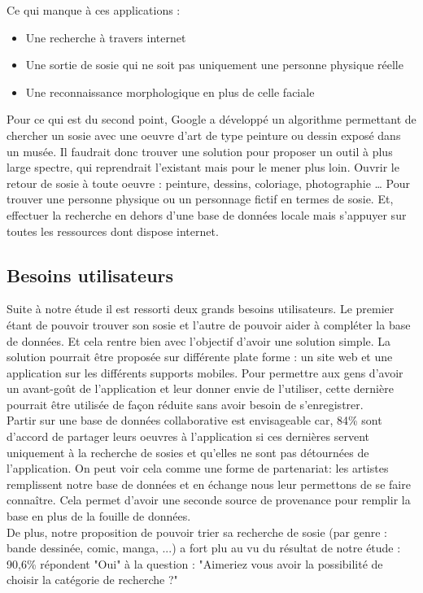 \documentclass[a4paper,12pt]{article}
\begin{document}
Ce qui manque à ces applications : 
\begin{itemize}
    \item Une recherche à travers internet 
    \item Une sortie de sosie qui ne soit pas uniquement une personne physique réelle 
    \item Une reconnaissance morphologique en plus de celle faciale
\end{itemize}

Pour ce qui est du second point, Google a développé un algorithme permettant de chercher un sosie avec une oeuvre d’art de type peinture ou dessin exposé dans un musée. Il faudrait donc trouver une solution pour proposer un outil à plus large spectre, qui reprendrait l’existant mais pour le mener plus loin. 
Ouvrir le retour de sosie à toute oeuvre : peinture, dessins, coloriage, photographie … Pour trouver une personne physique ou un personnage fictif en termes de sosie. Et, effectuer la recherche en dehors d'une base de données locale mais s'appuyer sur toutes les ressources dont dispose internet. 

\subsection{Besoins utilisateurs}
Suite à notre étude il est ressorti deux grands besoins utilisateurs. Le premier étant de pouvoir trouver son sosie et l'autre de pouvoir aider à compléter la base de données. Et cela rentre bien avec l'objectif d'avoir une solution simple. La solution pourrait être proposée sur différente plate forme : un site web et une application sur les différents supports mobiles. Pour permettre aux gens d'avoir un avant-goût de l'application et leur donner envie de l'utiliser, cette dernière pourrait être utilisée de façon réduite sans avoir besoin de s'enregistrer. 
\\ Partir sur une base de données collaborative est envisageable car, 84\% sont d'accord de partager leurs oeuvres à l'application si ces dernières servent uniquement à la recherche de sosies et qu'elles ne sont pas détournées de l'application. On peut voir cela comme une forme de partenariat: les artistes remplissent notre base de données et en échange nous leur permettons de se faire connaître. Cela permet d'avoir une seconde source de provenance pour remplir la base en plus de la fouille de données. 
\\De plus, notre proposition de pouvoir trier sa recherche de sosie (par genre : bande dessinée, comic, manga, ...) a fort plu au vu du résultat de notre étude : 90,6\% répondent "Oui" à la question : "Aimeriez vous avoir la possibilité de choisir la catégorie de recherche ?"  
\end{document}

